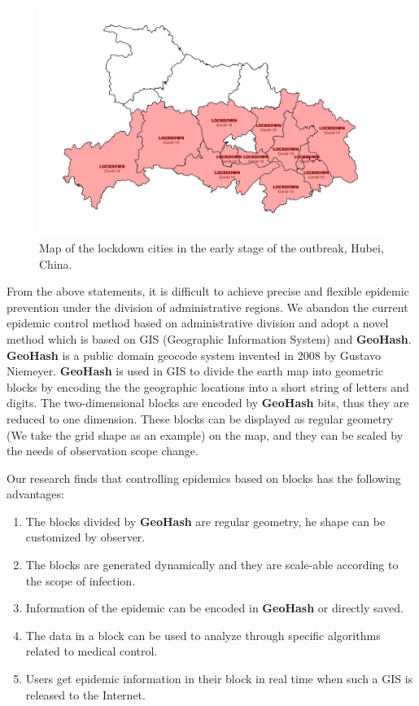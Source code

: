 \documentclass[conference]{IEEEtran}
\begin{document}
\begin{figure}[h]
    \centering
    \includegraphics[width=\linewidth]{hubei.png}
    \caption{Map of the lockdown cities in the early stage of the outbreak, Hubei, China.}
\end{figure}

From the above statements, it is difficult to achieve precise and flexible epidemic prevention under the division of administrative regions.
We abandon the current epidemic control method based on administrative division and adopt a novel method which is based on GIS (Geographic Information System)\cite{clarke1986advances} and \textbf{GeoHash}.
\textbf{GeoHash} is a public domain geocode system invented in 2008 by Gustavo Niemeyer\cite{niemeyer2008geohash}.
\textbf{GeoHash} is used in GIS to divide the earth map into geometric blocks by encoding the the geographic locations into a short string of letters and digits.
The two-dimensional blocks are encoded by \textbf{GeoHash} bits, thus they are reduced to one dimension.
These blocks can be displayed as regular geometry (We take the grid shape as an example) on the map, and they can be scaled by the needs of observation scope change.

Our research finds that controlling epidemics based on blocks has the following advantages:
\begin{enumerate}
    \item The blocks divided by \textbf{GeoHash} are regular geometry, he shape can be customized by observer.
    \item The blocks are generated dynamically and they are scale-able according to the scope of infection.
    \item Information of the epidemic can be encoded in \textbf{GeoHash} or directly saved.
    \item The data in a block can be used to analyze through specific algorithms related to medical control.
    \item Users get epidemic information in their block in real time when such a GIS is released to the Internet.
\end{enumerate}
\end{document}
